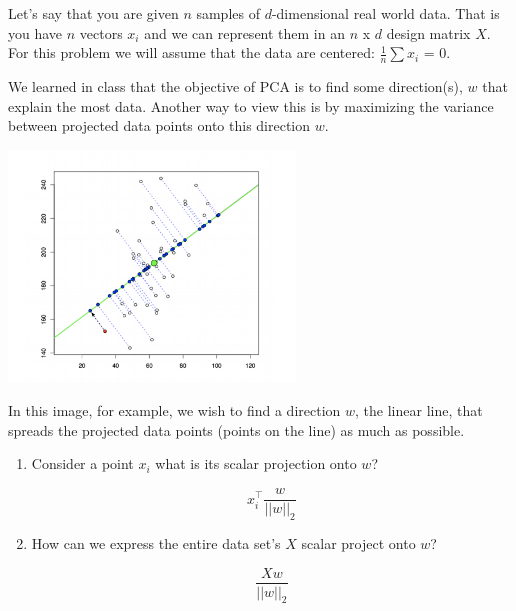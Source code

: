 
Let's say that you are given $n$ samples of $d$-dimensional real world data. That is you have $n$ vectors $x_i$ and we can represent them in an $n$ x $d$ design matrix $X$. For this problem we will assume that the data are centered: $\frac{1}{n}\sum{{x_i}}$ = $0$.

\begin{Parts}

\Part 
We learned in class that the objective of PCA is to find some direction(s), $w$ that explain the most data. Another way to view this is by maximizing the variance between projected data points onto this direction $w$.
\begin{center}
    \includegraphics[width=3in]{"src/pca/varience_proj"}
\end{center}
In this image, for example, we wish to find a direction $w$, the linear line, that spreads the projected data points (points on the line) as much as possible.

\begin{enumerate}
    \item Consider a point $x_i$ what is its scalar projection onto $w$?
    
    \begin{solution}
    \begin{equation*}
        x_{i}^{\top} \frac{w}{||w||_2}
    \end{equation*}
\end{solution}
    
    \item How can we express the entire data set's $X$ scalar project onto $w$?
    
    \begin{solution}
    \begin{equation*}
        \frac{Xw}{||w||_2}
    \end{equation*}
\end{solution}
    

\end{enumerate}
\end{Parts}
